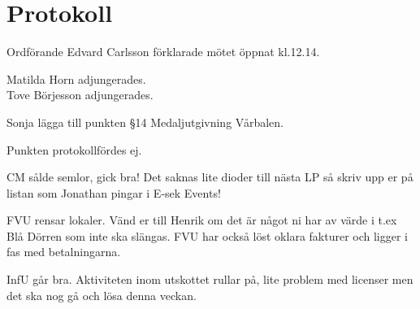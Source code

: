 \documentclass[10pt]{article}
\def\mo{Edvard Carlsson}
\begin{document}
\section*{Protokoll}
\begin{paragrafer}
Ordförande {\mo} förklarade mötet öppnat kl.12.14.

{\valavmo}

{\valavms}

{\valavj}

{\tosg}

Matilda Horn adjungerades. \\
Tove Börjesson adjungerades. 


Sonja \ypa lägga till punkten §14 Medaljutgivning Vårbalen.

\Mbaby



\begin{fyllnadsval} %


\end{fyllnadsval}

\begin{paragrafer}
Punkten protokollfördes ej.

CM sålde semlor, gick bra! Det saknas lite dioder till nästa LP så skriv upp er på listan som Jonathan pingar i E-sek Events!

FVU rensar lokaler. Vänd er till Henrik om det är något ni har av värde i t.ex Blå Dörren som inte ska slängas. FVU har också  löst oklara fakturer och ligger i fas med betalningarna. 

InfU går bra. Aktiviteten inom utskottet rullar på, lite problem med licenser men det ska nog gå och lösa denna veckan.


\end{paragrafer}
\end{paragrafer}
\end{document}
